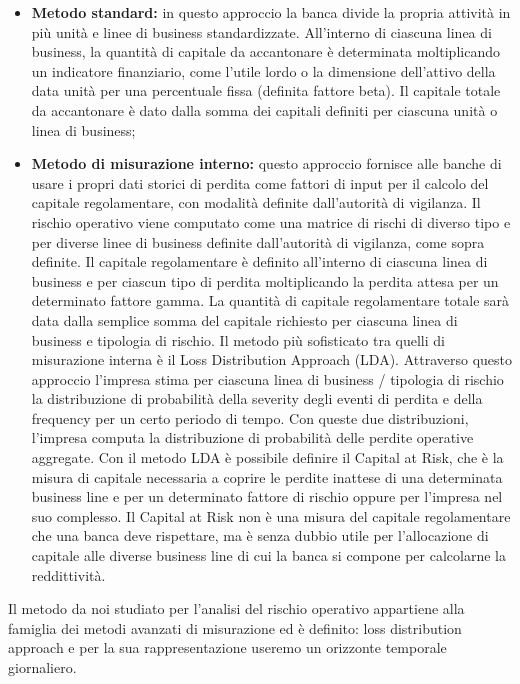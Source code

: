 \documentclass[titlepage]{article}
\begin{document}
\begin{itemize}
\begin{itemize}
\item		\textbf{Metodo standard:} in questo approccio la banca divide la propria attività in più unità e linee di business standardizzate. All’interno di ciascuna linea di business, la quantità di capitale da accantonare è determinata moltiplicando un indicatore finanziario, come l’utile lordo o la dimensione dell’attivo della data unità per una percentuale fissa (definita fattore beta). Il capitale totale da accantonare è dato dalla somma dei capitali definiti per ciascuna unità o linea di business;

\item		\textbf{Metodo di misurazione interno:} questo approccio fornisce alle banche di usare i propri dati storici di perdita come fattori di input per il calcolo del capitale regolamentare, con modalità definite dall’autorità di vigilanza. Il rischio operativo viene computato come una matrice di rischi di diverso tipo e per diverse linee di business definite dall’autorità di vigilanza, come sopra definite. Il capitale regolamentare è definito all’interno di ciascuna linea di business e per ciascun tipo di perdita moltiplicando la perdita attesa per un determinato fattore gamma. La quantità di capitale regolamentare totale sarà data dalla semplice somma del capitale richiesto per ciascuna linea di business e tipologia di rischio. Il metodo più sofisticato tra quelli di misurazione interna è il Loss Distribution Approach (LDA). Attraverso questo approccio l’impresa stima per ciascuna linea di business / tipologia di rischio la distribuzione di probabilità della severity degli eventi di perdita e della frequency per un certo periodo di tempo. Con queste due distribuzioni, l’impresa computa la distribuzione di probabilità delle perdite operative aggregate. Con il metodo LDA è possibile definire il Capital at Risk, che è la misura di capitale necessaria a coprire le perdite inattese di una determinata business line e per un determinato fattore di rischio oppure per l’impresa nel suo complesso. Il Capital at Risk non è una misura del capitale regolamentare che una banca deve rispettare, ma è senza dubbio utile per l’allocazione di capitale alle diverse business line di cui la banca si compone per calcolarne la reddittività.
\end{itemize}
Il metodo da noi studiato per l’analisi del rischio operativo appartiene alla famiglia dei metodi avanzati di misurazione ed è definito: loss distribution approach e per la sua rappresentazione useremo un orizzonte temporale giornaliero.





\end{itemize}
\end{document}
